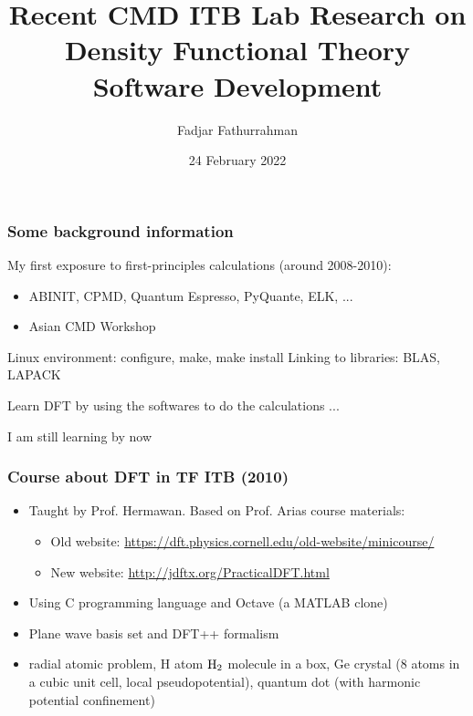 




\title{Recent CMD ITB Lab Research on\\
Density Functional Theory Software Development}
\author{Fadjar Fathurrahman}
\date{24 February 2022}

\frame{\titlepage}


\begin{frame}
\frametitle{Some background information}

My first exposure to first-principles calculations (around 2008-2010):
\begin{itemize}
\item ABINIT, CPMD, Quantum Espresso, PyQuante, ELK, ...
\item Asian CMD Workshop
\end{itemize}

Linux environment: configure, make, make install
Linking to libraries: BLAS, LAPACK

Learn DFT by using the softwares to do the calculations ...

I am still learning by now

\end{frame}



\begin{frame}
\frametitle{Course about DFT in TF ITB (2010)}

\begin{itemize}
\item Taught by Prof. Hermawan. Based on Prof. Arias course materials:
  \begin{itemize}
  \item Old website: {\footnotesize\url{https://dft.physics.cornell.edu/old-website/minicourse/}}
  \item New website: {\footnotesize\url{http://jdftx.org/PracticalDFT.html}}
  \end{itemize}
\item Using C programming language and Octave (a MATLAB clone)
\item Plane wave basis set and DFT++ formalism
\item radial atomic problem, H atom $\ce{H2}$ molecule in a box, Ge crystal (8 atoms in a
cubic unit cell, local pseudopotential), quantum dot (with harmonic potential confinement)
\end{itemize}

\end{frame}


